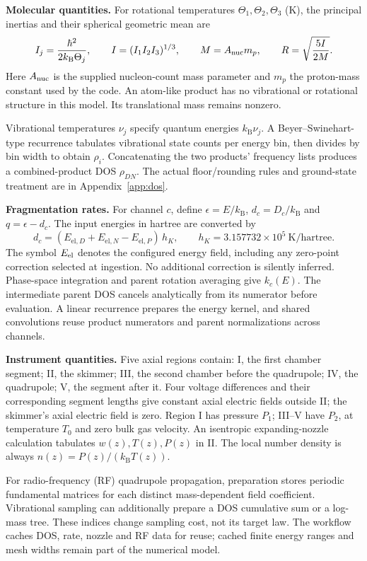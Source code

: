 \documentclass[10pt,a4paper]{article}
\newcommand{\kb}{k_{\mathrm B}}
\begin{document}
\textbf{Molecular quantities.} For rotational temperatures
$\Theta_1,\Theta_2,\Theta_3$ (K), the principal inertias and their spherical
geometric mean are
\[
 I_j=\frac{\hbar^2}{2\kb\Theta_j},\qquad
 I=(I_1I_2I_3)^{1/3},\qquad
 M=A_{\rm nuc}m_p,\qquad R=\sqrt{\frac{5I}{2M}}.
\]
Here $A_{\rm nuc}$ is the supplied nucleon-count mass parameter and $m_p$ the
proton-mass constant used by the code. An atom-like product has no vibrational
or rotational structure in this model. Its translational mass remains nonzero.

Vibrational temperatures $\nu_j$ specify quantum energies $\kb\nu_j$.
A Beyer--Swinehart-type recurrence tabulates vibrational state counts per energy
bin, then divides by bin width to obtain $\rho_i$. Concatenating the two
products' frequency lists produces a combined-product DOS $\rho_{DN}$.
The actual floor/rounding rules and ground-state treatment are in
Appendix~\ref{app:dos}.

\textbf{Fragmentation rates.} For channel $c$, define $\epsilon=E/\kb$,
$d_c=D_c/\kb$ and $q=\epsilon-d_c$. The input energies in hartree are
converted by
\[
 d_c=(E_{\mathrm{el},D}+E_{\mathrm{el},N}-E_{\mathrm{el},P})\,h_K,
 \qquad h_K=3.157732\times10^5\ \mathrm{K/hartree}.
\]
The symbol $E_{\rm el}$ denotes the configured energy field, including any
zero-point correction selected at ingestion. No additional correction is
silently inferred. Phase-space integration and parent rotation averaging give
$k_c(E)$. The intermediate parent DOS cancels analytically from its numerator
before evaluation. A linear recurrence prepares the energy kernel, and shared
convolutions reuse product numerators and parent normalizations across channels.

\textbf{Instrument quantities.} Five axial regions contain: I, the first
chamber segment; II, the skimmer; III, the second chamber before the quadrupole;
IV, the quadrupole; V, the segment after it. Four voltage differences and their
corresponding segment lengths give constant axial electric fields outside II;
the skimmer's axial electric field is zero. Region I has pressure $P_1$;
III--V have $P_2$, at temperature $T_0$ and zero bulk gas velocity.
An isentropic expanding-nozzle calculation tabulates $w(z),T(z),P(z)$ in II.
The local number density is always $n(z)=P(z)/(\kb T(z))$.

For radio-frequency (RF) quadrupole propagation, preparation stores periodic
fundamental matrices for each distinct mass-dependent field coefficient.
Vibrational sampling can additionally prepare a DOS cumulative sum or a
log-mass tree. These indices change sampling cost, not its target law.
The workflow caches DOS, rate, nozzle and RF data for reuse; cached finite
energy ranges and mesh widths remain part of the numerical model.
\end{document}
